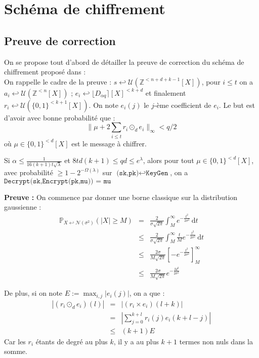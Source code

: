 \documentclass[11pt,a4paper]{article}
\begin{document}
\section{Schéma de chiffrement}

\subsection{Preuve de correction}
On se propose tout d'abord de détailler la preuve de correction du schéma de chiffrement proposé dans \cite{mplwe} : \\

On rappelle le cadre de la preuve : $s \hookleftarrow \mathcal{U}(\mathbb{Z}^{<n+d+k-1}[X])$, pour $i\leq t$ on a $a_i \hookleftarrow \mathcal{U}(\mathbb{Z}^{<n}[X])$ ; $e_i \hookleftarrow \lfloor D_{\alpha q}\rceil[X]^{<k+d}$ et finalement $r_i \hookleftarrow \mathcal{U}(\{0,1\}^{<k+1}[X])$. On note $e_i(j)$ le $j$-ème coefficient de $e_i$. Le but est d'avoir avec bonne probabilité que : 
\[\|\mu + 2\sum_{i \leq t}r_i \odot_d e_i  \|_\infty < q/2 \] où $\mu \in \{0,1\}^{<d}[X]$ est le message à chiffrer. 
\begin{theorem}
Si $\alpha \leq \frac{1}{16(k+1)t\sqrt{\lambda}}$ et  $8td(k+1)\leq qd\leq e^\lambda$, alors pour tout $\mu \in \{0,1\}^{<d}[X]$, avec probabilité $\geq 1 - 2^{-\Omega(\lambda)}$ sur $\texttt{(sk,pk)}\hookleftarrow\texttt{KeyGen} $, on a $\texttt{Decrypt(sk,Encrypt(pk,mu)) = mu}$ 
\end{theorem}
\textbf{Preuve :}
On commence par donner une borne classique sur la distribution gaussienne : 
\begin{eqnarray*}
\mathbb{P}_{X \hookleftarrow \mathcal{N}(\sigma^2)}(|X| \geq M) &=& \frac{2}{\sigma \sqrt{2 \pi}} \int_{M}^\infty e^{-\frac{t^2}{2 \sigma^2}} \, \mathrm{d}t \\
&\leq &  \frac{2}{\sigma \sqrt{2 \pi}}\int_{M}^\infty \frac{t}{M} e^{-\frac{t^2}{2 \sigma^2}} \, \mathrm{d}t \\
& \leq & \frac{2\sigma}{M \sqrt{2 \pi}} [-e^{-\frac{t^2}{2 \sigma^2}}]_M^\infty \\
& \leq & \frac{2\sigma}{M \sqrt{2 \pi}} e^{-\frac{M^2}{2 \sigma^2}}
\end{eqnarray*}


De plus, si on note $E := \max_{i,j} |e_i(j)|$, on a que :  \\
\begin{eqnarray*}
|(r_i \odot_d e_i)(l)| &=& |(r_i\times e_i)(l+k)| \\
&=& |\sum_{j=0}^{k+l}r_i(j)e_i(k+l-j)| \\
&\leq& (k+1)E
\end{eqnarray*}
Car les $r_i$ étants de degré au plus $k$, il y a au plus $k+1$ termes non nuls dans la somme.\\
\end{document}
